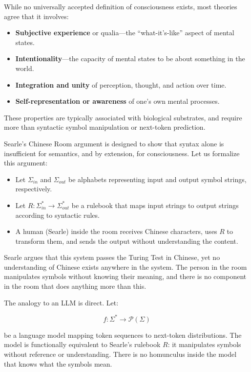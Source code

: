 \documentclass[12pt]{article}
\theoremstyle{plain}
\theoremstyle{definition}
\theoremstyle{remark}
\begin{document}
While no universally accepted definition of consciousness exists, most theories agree that it involves:
\begin{itemize}
    \item \textbf{Subjective experience} or qualia—the “what-it’s-like” aspect of mental states.
    \item \textbf{Intentionality}—the capacity of mental states to be about something in the world.
    \item \textbf{Integration and unity} of perception, thought, and action over time.
    \item \textbf{Self-representation or awareness} of one's own mental processes.
\end{itemize}

These properties are typically associated with biological substrates, and require more than syntactic symbol manipulation or next-token prediction.

Searle’s Chinese Room argument \parencite{searle1980minds} is designed to show that syntax alone is insufficient for semantics, and by extension, for consciousness. Let us formalize this argument:

\begin{itemize}
    \item Let \( \Sigma_{in} \) and \( \Sigma_{out} \) be alphabets representing input and output symbol strings, respectively.
    \item Let \( R: \Sigma_{in}^* \rightarrow \Sigma_{out}^* \) be a rulebook that maps input strings to output strings according to syntactic rules.
    \item A human (Searle) inside the room receives Chinese characters, uses \( R \) to transform them, and sends the output without understanding the content.
\end{itemize}

Searle argues that this system passes the Turing Test in Chinese, yet no understanding of Chinese exists anywhere in the system. The person in the room manipulates symbols without knowing their meaning, and there is no component in the room that does anything more than this.

The analogy to an LLM is direct. Let:

\[
f: \Sigma^* \rightarrow \mathcal{P}(\Sigma)
\]

be a language model mapping token sequences to next-token distributions. The model is functionally equivalent to Searle’s rulebook \( R \): it manipulates symbols without reference or understanding. There is no homunculus inside the model that knows what the symbols mean.
\end{document}
